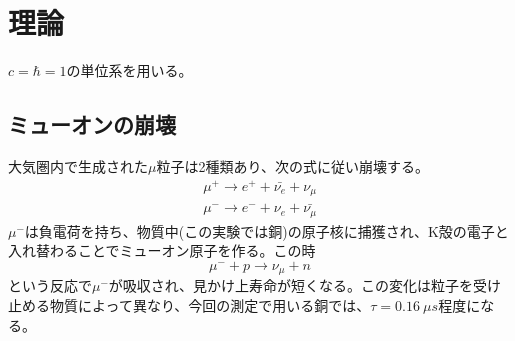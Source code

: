 \section{理論}
$c=\hbar=1$の単位系を用いる。

\subsection{ミューオンの崩壊}
大気圏内で生成された$\mu$粒子は2種類あり、次の式に従い崩壊する。
\begin{align}
\mu^+\to e^++\bar{\nu_e}+\nu_\mu \\
\mu^-\to e^-+{\nu_e}+\bar{\nu_\mu}
\end{align}
$\mu^-$は負電荷を持ち、物質中(この実験では銅)の原子核に捕獲され、K殻の電子と入れ替わることでミューオン原子を作る。この時
\begin{equation}
\mu^-+p \to\nu_\mu+n
\end{equation}
という反応で$\mu^-$が吸収され、見かけ上寿命が短くなる。この変化は粒子を受け止める物質によって異なり、今回の測定で用いる銅では、$\tau=0.16\ \mu s$程度になる。

